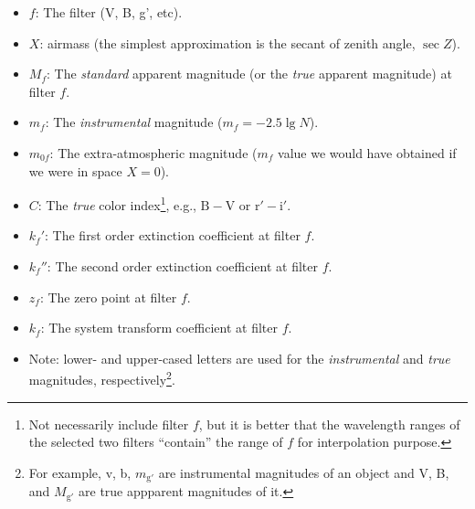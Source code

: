 \begin{itemize}
\item $ f $: The filter (V, B, g', etc).
\item $ X $: airmass (the simplest approximation is the secant of zenith angle, $ \sec Z $).
\item $ M_f $: The \emph{standard} apparent magnitude (or the \emph{true} apparent magnitude) at filter $ f $.
\item $ m_f $: The \emph{instrumental} magnitude ($ m_f = -2.5 \lg N $).
\item $ m_{0f} $: The extra-atmospheric magnitude ($ m_f $ value we would have obtained if we were in space $ X = 0 $).
\item $ C $: The \emph{true} color index\footnote{Not necessarily include filter $ f $, but it is better that the wavelength ranges of the selected two filters ``contain'' the range of $ f $ for interpolation purpose.}, e.g., $ \mathrm{B} - \mathrm{V} $ or $ \mathrm{r'} - \mathrm{i'} $.
\item $ k_f' $: The first order extinction coefficient at filter $ f $.
\item $ k_f'' $: The second order extinction coefficient at filter $ f $.
\item $ z_f $: The zero point at filter $ f $.
\item $ k_f $: The system transform coefficient at filter $ f $.
\item Note: lower- and upper-cased letters are used for the \emph{instrumental} and \emph{true} magnitudes, respectively\footnote{For example, v, b, $ m_\mathrm{g'} $ are instrumental magnitudes of an object and V, B, and $ M_\mathrm{g'} $ are true appparent magnitudes of it.}.
\end{itemize}


